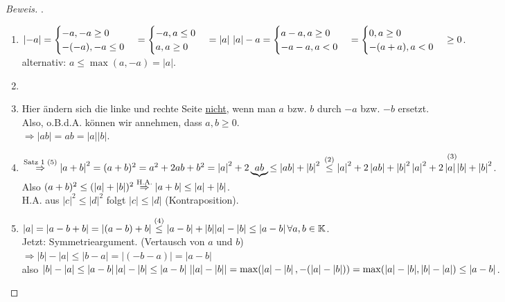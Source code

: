 \documentclass[12pt,a4paper,titlepage]{article} %
\theoremstyle{definition}
\theoremstyle{remark}
\newenvironment{bew}{\begin{proof}[Beweis]}{\end{proof}}
\begin{document}
\begin{bew} . %
	\begin{enumerate}
		\item $\left| -a \right| = 
		\begin{cases}
			-a, -a \geq 0 \\
			-(-a), -a \leq 0
		\end{cases}
		= \begin{cases}
			-a, a \leq 0\\
			a, a \geq 0
		\end{cases}
		= \left| a\right|\\
		\left|a\right| - a=\begin{cases}
			a-a,a\geq 0\\
			-a-a, a<0
		\end{cases}
		= \begin{cases}
			0, a \geq 0\\
			-(a+a), a<0
		\end{cases} \geq 0$.\\
		alternativ: $a \leq \max(a, -a) = \left|a\right|$.
		\item 
		\item Hier ändern sich die linke und rechte Seite \underline{nicht}, wenn man $a$ bzw. $b$ durch $-a$ bzw. $-b$ ersetzt.\\
		Also, o.B.d.A. können wir annehmen, dass $a,b \geq 0$.\\
		$\Rightarrow \left| ab\right| = ab = \left|a\right|\left|b\right|$.
		\item $\overset{\text{Satz 1 (5)}}{\Rightarrow} \left| a+b\right|^2 = (a+b)^2=a^2+2ab+b^2=\left|a\right|^2 + 2\underbrace{ab}{\leq \left| ab\right|} + \left|b\right|^2\\
		\overset{\text{(2)}}{\leq} \left|a\right|^2 + 2\left|ab\right| + \left|b\right|^2\\
		\overset{\text{(3)}}{\left|a\right|^2+2\left|a\right|\left|b\right| + \left|b\right|^2}$.\\
		Also $(a+b)^2 \leq (\left|a\right| + \left| b\right|)^2\\
		\overset{\text{H.A.}}{\Rightarrow}\left|a+b\right| \leq \left|a\right|+\left|b\right|$.\\
		H.A. aus $\left|c\right|^2 \leq \left|d\right|^2$ folgt $|c| \leq |d|$ (Kontraposition).
		\item $|a| = \left| a-b+b\right| = \left| (a-b) + b\right| \overset{\text{(4)}}{\leq} \left|a-b\right| + |b|\\
		|a|-|b|\leq \left|a-b\right| \forall a,b\in\mathbb{K}$.\\
		Jetzt: Symmetrieargument. (Vertausch von $a$ und $b$)\\
		$\Rightarrow |b| - |a| \leq \left|b-a\right| = \left|(-b-a)\right| = \left|a-b\right|$\\
		also $|b|-|a| \leq \left|a-b\right|\\
		|a|-|b| \leq \left|a-b\right|\\
		\left| |a|-|b|\right| = \max(\left|a\right|-\left|b\right|, -(|a|-|b|))=\max(|a|-|b|, |b|-|a|) \leq |a-b|$.
	\end{enumerate}
\end{bew}
\end{document}
